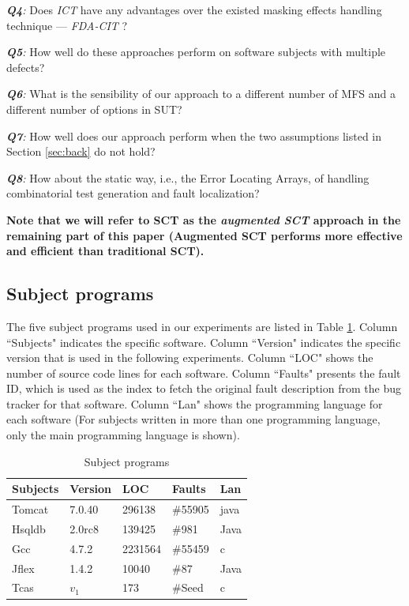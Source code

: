\documentclass[journal,12pt,onecolumn,draftclsnofoot,]{IEEEtran}
\begin{document}
\emph{\textbf{Q4}:} Does \emph{ICT} have any advantages over the existed masking effects handling technique --- \emph{FDA-CIT} \cite{yilmaz2013reducing}?

\emph{\textbf{Q5}:} How well do these approaches perform on software subjects with multiple defects?


\emph{\textbf{Q6}:} What is the sensibility of our approach to a different number of MFS and a different number of options in SUT?


\emph{\textbf{Q7}:} How well does our approach perform when the two assumptions listed in Section \ref{sec:back} do not hold?


\emph{\textbf{Q8}:} How about the static way, i.e., the Error Locating Arrays, of handling combinatorial  test generation and fault localization?


\textbf{Note that we will refer to SCT as the \emph{augmented SCT} approach in the remaining part of this paper (Augmented SCT performs more effective and efficient than traditional SCT).}


\subsection{Subject programs}\label{sec:subject}
The five subject programs used in our experiments are listed in Table \ref{subject}. Column ``Subjects" indicates the specific software. Column ``Version" indicates the specific version that is used in the following experiments. Column ``LOC" shows the number of source code lines for each software. Column ``Faults" presents the fault ID, which is used as the index to fetch the original fault description from the bug tracker for that software. Column ``Lan" shows the programming language for each software (For subjects written in more than one programming language, only the main programming language is shown).

\begin{table}[ht]
\caption{Subject programs}
\label{subject}
\centering
\begin{tabular}{l|l|l|l|l}
\hline
Subjects & Version & LOC & Faults &  Lan \\
\hline
Tomcat   &   7.0.40      & 296138    &   \#55905  & java  \\
Hsqldb   &   2.0rc8  &   139425   &    \#981  & Java \\
Gcc      &   4.7.2      &  2231564   & \#55459   &  c\\
Jflex    &    1.4.2     & 10040    &    \#87   & Java \\
Tcas     & $v_{1}$     &   173  &    \#Seed   & c \\ \hline
\end{tabular}

\end{table}
\end{document}
